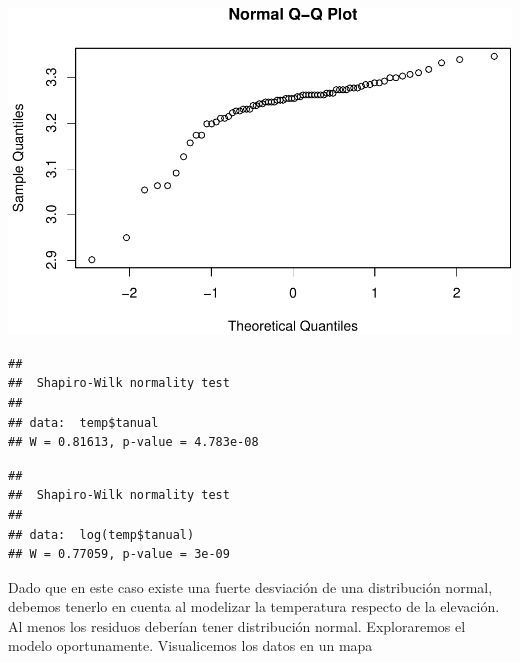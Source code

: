 \documentclass[11pt,]{article}
\newenvironment{Shaded}{\begin{snugshade}}{\end{snugshade}}
\newcommand{\KeywordTok}[1]{\textcolor[rgb]{0.13,0.29,0.53}{\textbf{#1}}}
\newcommand{\OperatorTok}[1]{\textcolor[rgb]{0.81,0.36,0.00}{\textbf{#1}}}
\newcommand{\NormalTok}[1]{#1}
\begin{document}
\begin{Shaded}
\end{Shaded}

\includegraphics[width=600px]{proyecto_files/figure-latex/esda-temp-4}

\begin{Shaded}
\end{Shaded}

\begin{verbatim}
## 
##  Shapiro-Wilk normality test
## 
## data:  temp$tanual
## W = 0.81613, p-value = 4.783e-08
\end{verbatim}

\begin{Shaded}
\end{Shaded}

\begin{verbatim}
## 
##  Shapiro-Wilk normality test
## 
## data:  log(temp$tanual)
## W = 0.77059, p-value = 3e-09
\end{verbatim}

Dado que en este caso existe una fuerte desviación de una distribución
normal, debemos tenerlo en cuenta al modelizar la temperatura respecto
de la elevación. Al menos los residuos deberían tener distribución
normal. Exploraremos el modelo oportunamente. Visualicemos los datos en
un mapa
\end{document}
